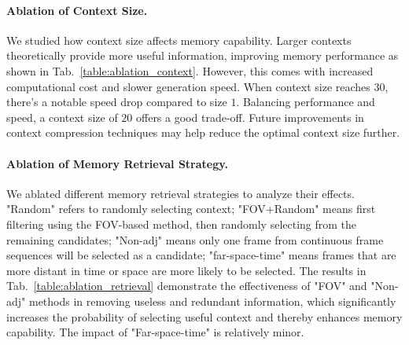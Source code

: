 \paragraph{Ablation of Context Size.} 
We studied how context size affects memory capability. Larger contexts theoretically provide more useful information, improving memory performance as shown in Tab.~\ref{table:ablation_context}. However, this comes with increased computational cost and slower generation speed. When context size reaches $30$, there's a notable speed drop compared to size $1$. Balancing performance and speed, a context size of $20$ offers a good trade-off. Future improvements in context compression techniques may help reduce the optimal context size further.



\paragraph{Ablation of Memory Retrieval Strategy.} We ablated different memory retrieval strategies to analyze their effects. "Random" refers to randomly selecting context; "FOV+Random" means first filtering using the FOV-based method, then randomly selecting from the remaining candidates; "Non-adj" means only one frame from continuous frame sequences will be selected as a candidate; "far-space-time" means frames that are more distant in time or space are more likely to be selected. The results in Tab.~\ref{table:ablation_retrieval} demonstrate the effectiveness of "FOV" and "Non-adj" methods in removing useless and redundant information, which significantly increases the probability of selecting useful context and thereby enhances memory capability. The impact of "Far-space-time" is relatively minor.


